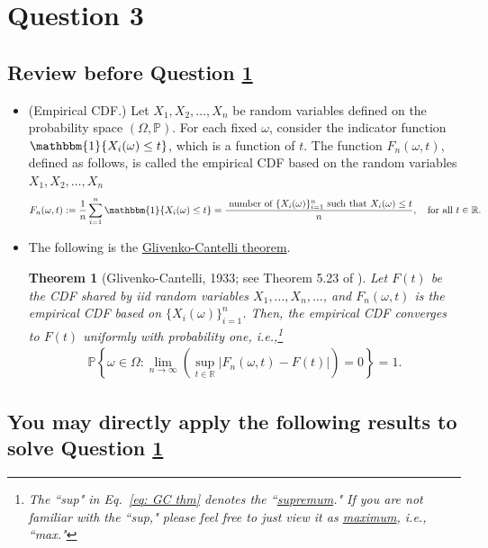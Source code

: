 \documentclass[11pt,letterpaper, leqno]{article}
\newtheorem{theorem}{Theorem}
\numberwithin{equation}{section}
\numberwithin{theorem}{section}
\numberwithin{lemma}{section}
\numberwithin{corollary}{section}
\numberwithin{definition}{section}
\numberwithin{proposition}{section}
\numberwithin{remark}{section}
\numberwithin{example}{section}
\begin{document}
\section{Question 3}\label{Q3}

\subsection{Review before Question \ref{Q3}}

\begin{itemize}
    \item (Empirical CDF.) Let $X_1, X_2, \ldots, X_n$ be random variables defined on the probability space $(\Omega,\mathbb{P})$. For each fixed $\omega$, consider the indicator function $\mathbbm{1}\{X_i(\omega)\le t\}$, which is a function of $t$. The function $F_n(\omega,t)$, defined as follows, is called the empirical CDF based on the random variables $X_1, X_2, \ldots, X_n$
    \begin{align*}
        F_n(\omega,t):=\frac{1}{n}\sum_{i=1}^n \mathbbm{1}\{X_i(\omega)\le t\}=\frac{\mbox{ number of }\{X_i(\omega)\}_{i=1}^n \mbox{ such that }X_i(\omega)\le t}{n},\ \ \mbox{ for all }t\in\mathbb{R}.
    \end{align*}
    
    \item The following is the \href{https://en.wikipedia.org/wiki/Glivenko%E2%80%93Cantelli_theorem}{Glivenko-Cantelli theorem}.
    \begin{theorem}[Glivenko-Cantelli, 1933; see Theorem 5.23 of \cite{klenke2013probability}]\label{thm: Glivenko-Cantelli}
Let $F(t)$ be the CDF shared by iid random variables $X_1, \ldots, X_n,\ldots$, and $F_n(\omega,t)$ is the empirical CDF based on $\{X_i(\omega)\}_{i=1}^n$. Then, the empirical CDF converges to $F(t)$ uniformly with probability one, i.e.,\footnote{The ``sup" in Eq.~\eqref{eq: GC thm} denotes the ``\href{https://en.wikipedia.org/wiki/Infimum_and_supremum}{supremum}." If you are not familiar with the ``sup," please feel free to just view it as \href{https://en.wiktionary.org/wiki/maximum}{maximum}, i.e., ``max."}
\begin{align}\label{eq: GC thm}
    \mathbb{P}\left\{\omega\in \Omega: \lim_{n\rightarrow\infty}\left(\sup_{t\in\mathbb{R}}\vert F_n(\omega,t)-F(t)\vert\right)=0\right\}=1.
\end{align}
\end{theorem}
\end{itemize}

\subsection{You may directly apply the following results to solve Question \ref{Q3}}
\end{document}

